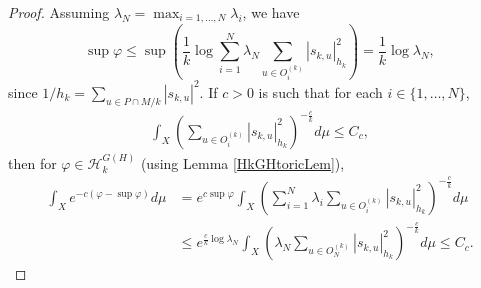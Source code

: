 \documentclass{article}
\newcommand\cH{{\mathcal H}}
\renewcommand{\>}{\rightarrow}
\theoremstyle{plain}
\theoremstyle{definition}
\begin{document}
\begin{proof}

Assuming $\lambda_N=\max_{i=1,\ldots,N}\lambda_i$, we have$$
\sup\varphi\leq\sup\left(\frac{1}{k}\log\sum_{i=1}^N\lambda_N\sum_{u\in O^{(k)}_i}|s_{k,u}|_{h_k}^2\right)=\frac{1}{k}\log\lambda_N,
$$
since 
$
1/h_k=\sum_{u\in P\cap M/k}|s_{k,u}|^2.
$
If $c>0$ is such that for each $i\in\{1,\ldots,N\}$,
\begin{align*}
    \int_X\left(\sum_{u\in O^{(k)}_i}\left|s_{k,u}\right|_{h_k}^2\right)^{-\frac{c}{k}}d\mu\leq C_c,
\end{align*}
then for $\varphi\in\cH_k^{G(H)}$ (using Lemma \ref{HkGHtoricLem}),
\begin{align*}
\int_X e^{-c(\varphi-\sup\varphi)}d\mu
&=
    e^{c\sup\varphi}\int_X\left( \sum_{i=1}^N\lambda_i\sum_{u\in O^{(k)}_i}|s_{k,u}|_{h_k}^2\right)^{-\frac{c}{k}}d\mu\\
    &\leq e^{\frac{c}{k}\log\lambda_N}
    \int_X\left(\lambda_N\sum_{u\in O^{(k)}_N}\left|s_{k,u}\right|_{h_k}^2\right)^{-\frac{c}{k}}d\mu
    \leq C_c.
\end{align*}



\end{proof}
\end{document}
